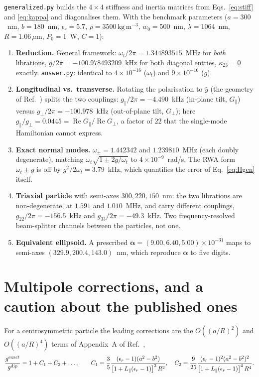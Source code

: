 \documentclass[11pt,a4paper]{article}
\newcommand{\bal}{\boldsymbol{\alpha}}
\newcommand{\unit}[1]{\,\mathrm{#1}}
\begin{document}
\texttt{generalized.py} builds the $4\times4$ stiffness and inertia matrices
from Eqs.~\eqref{eq:stiff} and \eqref{eq:kappa} and diagonalises them.  With the
benchmark parameters ($a=300$~nm, $b=180$~nm, $\epsilon_r=5.7$,
$\rho=3500\unit{kg\,m^{-3}}$, $w_0=500$~nm, $\lambda=1064$~nm, $R=1.06\,\mu$m,
$P_0=1$~W, $C=1$):

\begin{enumerate}\itemsep3pt
\item \textbf{Reduction.}  General framework: $\omega_t/2\pi=1.344893515$~MHz for
\emph{both} librations, $g/2\pi=-100.978493209$~kHz for both diagonal entries,
$\kappa_{23}=0$ exactly.  \texttt{answer.py}: identical to
$4\times10^{-16}$ ($\omega_t$) and $9\times10^{-16}$ ($g$).
\item \textbf{Longitudinal vs.\ transverse.}  Rotating the polarisation to
$\hat y$ (the geometry of Ref.~\cite{Zhang2025}) splits the two couplings:
$g_{\parallel}/2\pi=-4.490$~kHz (in-plane tilt, $G_{\parallel}$) versus
$g_{\perp}/2\pi=-100.978$~kHz (out-of-plane tilt, $G_{\perp}$); here
$g_{\parallel}/g_{\perp}=0.0445=\operatorname{Re}G_{\parallel}/
\operatorname{Re}G_{\perp}$, a factor of $22$ that the single-mode
Hamiltonian cannot express.
\item \textbf{Exact normal modes.}  $\omega_{\pm}=1.442342$ and $1.239810$~MHz
(each doubly degenerate), matching $\omega_t\sqrt{1\pm2g/\omega_t}$ to
$4\times10^{-9}$~rad/s.  The RWA form $\omega_t\pm g$ is off by
$g^{2}/2\omega_t=3.79$~kHz, which quantifies the error of Eq.~\eqref{eq:Hgen}
itself.
\item \textbf{Triaxial particle} with semi-axes $300,220,150$~nm: the two
librations are non-degenerate, at $1.591$ and $1.010$~MHz, and carry different
couplings, $g_{22}/2\pi=-156.5$~kHz and $g_{33}/2\pi=-49.3$~kHz.  Two
frequency-resolved beam-splitter channels between the particles, not one.
\item \textbf{Equivalent ellipsoid.}  A prescribed
$\bal=(9.00,6.40,5.00)\times10^{-31}$ maps to semi-axes
$(329.9,200.4,143.0)$~nm, which reproduce $\bal$ to five digits.
\end{enumerate}

\section{Multipole corrections, and a caution about the published ones}

For a centrosymmetric particle the leading corrections are the
$O((a/R)^{2})$ and $O((a/R)^{4})$ terms of Appendix~A of Ref.~\cite{Zhang2025},
\begin{equation}
  \frac{g^{\rm exact}}{g^{\rm dip}}=1+C_1+C_2+\dots,\qquad
  C_1=\frac{3}{5}\frac{(\epsilon_r-1)(a^{2}-b^{2})}
  {\left[1+L_{\parallel}(\epsilon_r-1)\right]^{2}R^{2}},\quad
  C_2=\frac{9}{25}\frac{(\epsilon_r-1)^{2}(a^{2}-b^{2})^{2}}
  {\left[1+L_{\parallel}(\epsilon_r-1)\right]^{4}R^{4}} .
  \label{eq:C1C2}
\end{equation}
\end{document}
